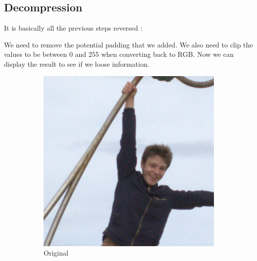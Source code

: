 \subsection{Decompression}

It is basically all the previous steps reversed :

We need to remove the potential padding that we added.
We also need to clip the values to be between 0 and 255 when
converting back to RGB.
Now we can display the result to see if we loose information.


\begin{figure}[H]
    \centering
    \begin{subfigure}[t]{0.4\textwidth}
        \centering
        \includegraphics[width=\linewidth]{src/assets/tests/tests.png}
        \caption{Original}
        \label{fig:tests-or}
    \end{subfigure}
    \hfill
    \begin{subfigure}[t]{0.4\textwidth}
        \centering

\end{subfigure}
\end{figure}

